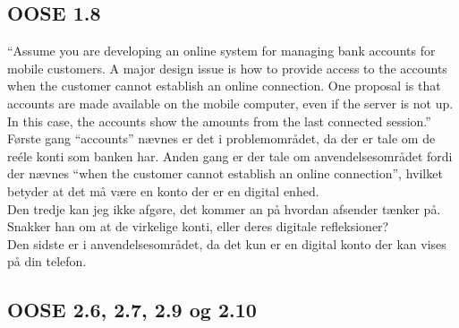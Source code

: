 \documentclass{article}
\begin{document}
\subsection{OOSE 1.8}
“Assume you are developing an online system for managing bank accounts for
mobile customers. A major design issue is how to provide access to the accounts
when the customer cannot establish an online connection. One proposal is that
accounts are made available on the mobile computer, even if the server is not up. In
this case, the accounts show the amounts from the last connected session.”
\\
Første gang “accounts” nævnes er det i problemområdet, da der er tale om de reéle konti som banken har.
Anden gang er der tale om anvendelsesområdet fordi der nævnes “when the customer cannot establish an online connection”, hvilket betyder at det må være en konto der er en digital enhed.
\\
Den tredje kan jeg ikke afgøre, det kommer an på hvordan afsender tænker på. Snakker han om at de virkelige konti, eller deres digitale refleksioner? \\
Den sidste er i anvendelsesområdet, da det kun er en digital konto der kan vises på din telefon.

\subsection{OOSE 2.6, 2.7, 2.9 og 2.10}
\end{document}
